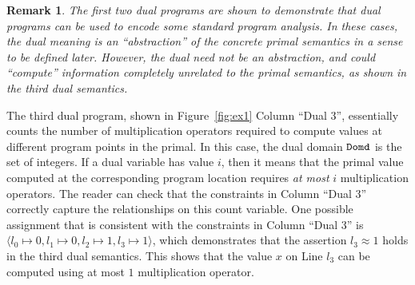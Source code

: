 \documentclass[preprint]{sig-alternate-05-2015}
\newtheorem{remark}{Remark}
\def\domd{{\tt{Domd}}}
\begin{document}
\begin{remark}
  The first two dual programs are shown to demonstrate that dual programs
  can be used to encode some standard program analysis. 
  In these cases, the dual meaning
  is an ``abstraction'' of the concrete primal semantics 
  in a sense to be defined later. %
  However, the dual need not be an abstraction, and could ``compute'' information
  completely unrelated to the primal semantics, as shown in the third dual semantics.
\end{remark}

The third dual program, shown in Figure~\ref{fig:ex1} Column ``Dual 3'',
essentially counts the number of multiplication operators
required to compute values at different program points in the primal.
In this case, the dual domain
$\domd$ is the set of integers.
If a dual variable has value $i$,
then it means that the primal value computed at the corresponding program location
requires {\em{at most}} $i$ multiplication operators.
The reader can check that the constraints in Column ``Dual 3'' correctly
capture the relationships on this count variable.
One possible assignment that is consistent with the constraints in Column ``Dual 3''
is $\langle l_0 \mapsto 0, l_1 \mapsto 0, l_2\mapsto 1, l_3\mapsto 1\rangle$,
which demonstrates that
the assertion $l_3\approx 1$ holds in the third dual semantics. This shows that the
value $x$ on Line $l_3$ can be computed using at most $1$ multiplication operator.


\end{document}
